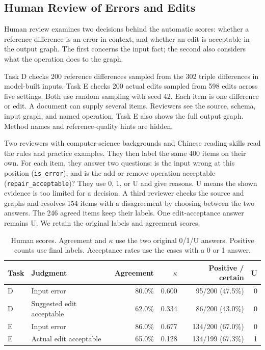 \subsection{Human Review of Errors and Edits}
\label{sec:eval:human}

Human review examines two decisions behind the automatic scores:
whether a reference difference is an error in context, and whether an
edit is acceptable in the output graph. The first concerns the input
fact; the second also considers what the operation does to the graph.

Task D checks 200 reference differences sampled from the 302 triple
differences in model-built inputs. Task E checks 200 actual edits sampled
from 598 edits across five settings. Both use random sampling with seed 42.
Each item is one difference or edit. A document can supply several items.
Reviewers see the source, schema, input graph, and named operation.
Task E also shows the full output graph. Method names and reference-quality
hints are hidden.

Two reviewers with computer-science backgrounds and Chinese reading skills
read the rules and practice examples. They then label the same 400 items
on their own. For each item, they answer two questions: is the input wrong
at this position (\texttt{is\_error}), and is the add or remove operation
acceptable (\texttt{repair\_acceptable})? They use 0, 1, or U and give reasons.
U means the shown evidence is too limited for a decision.
A third reviewer checks the source and graphs and resolves 154 items with
a disagreement by choosing between the two answers. The 246 agreed items
keep their labels. One edit-acceptance answer remains U.
We retain the original labels and agreement scores.

\begin{table}[t]
\centering
\caption{Human scores. Agreement and $\kappa$ use the two original 0/1/U answers. Positive counts use final labels. Acceptance rates use the cases with a 0 or 1 answer.}
\label{tab:human_review}
\small
\begin{tabular}{llrrrr}
\toprule
Task & Judgment & Agreement & $\kappa$ & Positive / certain & U \\
\midrule
D & Input error & 80.0\% & 0.600 & 95/200 (47.5\%) & 0 \\
D & Suggested edit acceptable & 62.0\% & 0.334 & 86/200 (43.0\%) & 0 \\
E & Input error & 86.0\% & 0.677 & 134/200 (67.0\%) & 0 \\
E & Actual edit acceptable & 65.0\% & 0.128 & 134/199 (67.3\%) & 1 \\
\bottomrule
\end{tabular}
\end{table}

